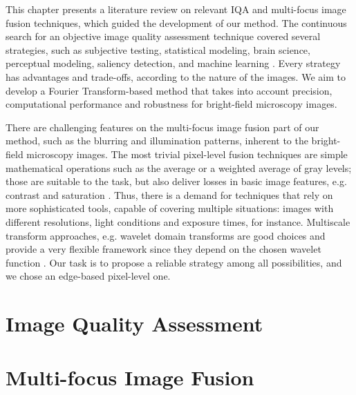 This chapter presents a literature review on relevant IQA and multi-focus image fusion techniques, which guided the development of our method. The continuous search for an objective image quality assessment technique covered several strategies, such as subjective testing, statistical modeling, brain science, perceptual modeling, saliency detection, and machine learning \cite{tang2019feature}. Every strategy has advantages and trade-offs, according to the nature of the images. We aim to develop a Fourier Transform-based method that takes into account precision, computational performance and robustness for bright-field microscopy images.

There are challenging features on the multi-focus image fusion part of our method, such as the blurring and illumination patterns, inherent to the bright-field microscopy images. The most trivial pixel-level fusion techniques are simple mathematical operations such as the average or a weighted average of gray levels; those are suitable to the task, but also deliver losses in basic image features, e.g. contrast and saturation \cite{zhang2009multifocus}. Thus, there is a demand for techniques that rely on more sophisticated tools, capable of covering multiple situations: images with different resolutions, light conditions and exposure times, for instance. Multiscale transform approaches, e.g. wavelet domain transforms are good choices and provide a very flexible framework since they depend on the chosen wavelet function \cite{pajares2004wavelet}. Our task is to propose a reliable strategy among all possibilities, and we chose an edge-based pixel-level one.

\section{Image Quality Assessment}


\section{Multi-focus Image Fusion}
